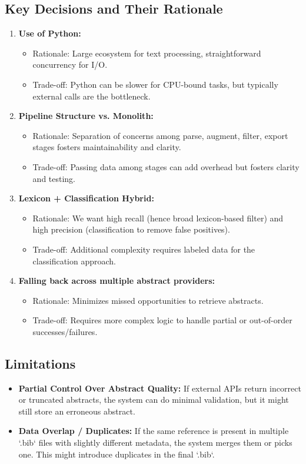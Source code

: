 \documentclass[12pt]{article}
\begin{document}
\subsection{Key Decisions and Their Rationale}
\begin{enumerate}[label=\arabic*.]
  \item \textbf{Use of Python:} 
    \begin{itemize}
      \item Rationale: Large ecosystem for text processing, straightforward concurrency for I/O. 
      \item Trade-off: Python can be slower for CPU-bound tasks, but typically external calls are the bottleneck. 
    \end{itemize}

  \item \textbf{Pipeline Structure vs. Monolith:}
    \begin{itemize}
      \item Rationale: Separation of concerns among parse, augment, filter, export stages fosters maintainability and clarity.
      \item Trade-off: Passing data among stages can add overhead but fosters clarity and testing.
    \end{itemize}

  \item \textbf{Lexicon + Classification Hybrid:} 
    \begin{itemize}
      \item Rationale: We want high recall (hence broad lexicon-based filter) and high precision (classification to remove false positives).
      \item Trade-off: Additional complexity requires labeled data for the classification approach. 
    \end{itemize}

  \item \textbf{Falling back across multiple abstract providers:}
    \begin{itemize}
      \item Rationale: Minimizes missed opportunities to retrieve abstracts.
      \item Trade-off: Requires more complex logic to handle partial or out-of-order successes/failures. 
    \end{itemize}
\end{enumerate}

\subsection{Limitations}
\begin{itemize}
  \item \textbf{Partial Control Over Abstract Quality:} If external APIs return incorrect or truncated abstracts, the system can do minimal validation, but it might still store an erroneous abstract. 
  \item \textbf{Data Overlap / Duplicates:} If the same reference is present in multiple `.bib` files with slightly different metadata, the system merges them or picks one. This might introduce duplicates in the final `.bib`. 
\end{itemize}
\end{document}
